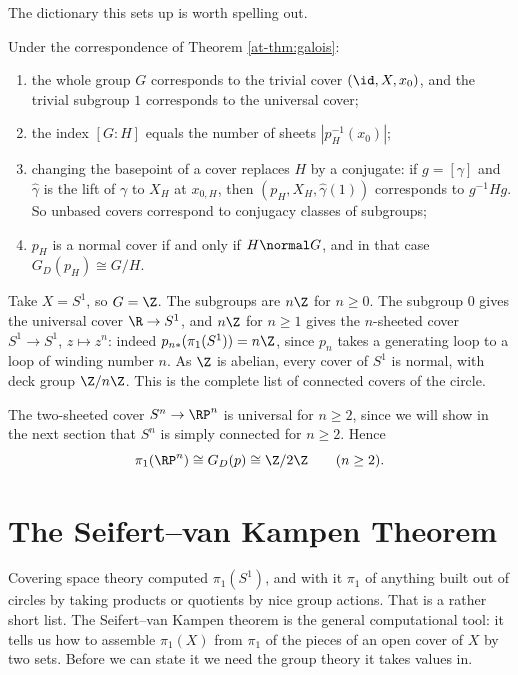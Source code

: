 The dictionary this sets up is worth spelling out.

\begin{remark} \label{rmk:galois-dictionary}
	Under the correspondence of Theorem \ref{at-thm:galois}:
	\begin{enumerate}
		\item the whole group $G$ corresponds to the trivial cover $(\id, X, x_0)$, and the trivial subgroup $1$ corresponds to the universal cover;
		\item the index $[G:H]$ equals the number of sheets $|p_H^{-1}(x_0)|$;
		\item changing the basepoint of a cover replaces $H$ by a conjugate: if $g = [\gamma]$ and $\hat\gamma$ is the lift of $\gamma$ to $X_H$ at $x_{0,H}$, then $(p_H, X_H, \hat\gamma(1))$ corresponds to $g^{-1}Hg$. So unbased covers correspond to conjugacy classes of subgroups;
		\item $p_H$ is a normal cover if and only if $H \normal G$, and in that case $G_D(p_H) \cong G/H$.
	\end{enumerate}
\end{remark}

\begin{example}
	Take $X = S^1$, so $G = \Z$. The subgroups are $n\Z$ for $n \geq 0$. The subgroup $0$ gives the universal cover $\R \to S^1$, and $n\Z$ for $n \geq 1$ gives the $n$-sheeted cover $S^1 \to S^1$, $z \mapsto z^n$: indeed $p_{n*}(\pi_1(S^1)) = n\Z$, since $p_n$ takes a generating loop to a loop of winding number $n$. As $\Z$ is abelian, every cover of $S^1$ is normal, with deck group $\Z/n\Z$. This is the complete list of connected covers of the circle.
\end{example}

\begin{example}
	The two-sheeted cover $S^n \to \RP^n$ is universal for $n \geq 2$, since we will show in the next section that $S^n$ is simply connected for $n \geq 2$. Hence
	$$
	\pi_1(\RP^n) \cong G_D(p) \cong \Z/2\Z \qquad (n \geq 2).
	$$
\end{example}

\section{The Seifert--van Kampen Theorem}

Covering space theory computed $\pi_1(S^1)$, and with it $\pi_1$ of anything built out of
circles by taking products or quotients by nice group actions. That is a rather short
list. The Seifert--van Kampen theorem is the general computational tool: it tells us how
to assemble $\pi_1(X)$ from $\pi_1$ of the pieces of an open cover of $X$ by two sets.
Before we can state it we need the group theory it takes values in.

